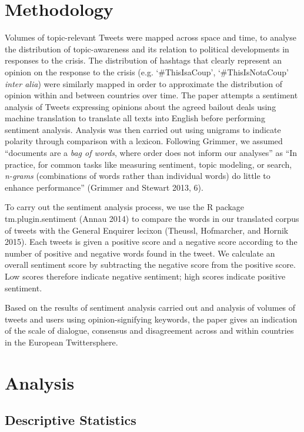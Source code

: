 \documentclass[]{article}
\begin{document}
\section{Methodology}\label{methodology}

Volumes of topic-relevant Tweets were mapped across space and time, to
analyse the distribution of topic-awareness and its relation to
political developments in responses to the crisis. The distribution of
hashtags that clearly represent an opinion on the response to the crisis
(e.g. `\#ThisIsaCoup', `\#ThisIsNotaCoup' \emph{inter alia}) were
similarly mapped in order to approximate the distribution of opinion
within and between countries over time. The paper attempts a sentiment
analysis of Tweets expressing opinions about the agreed bailout deals
using machine translation to translate all texts into English before
performing sentiment analysis. Analysis was then carried out using
unigrams to indicate polarity through comparison with a lexicon.
Following Grimmer, we assumed ``documents are a \emph{bag of words},
where order does not inform our analyses'' as ``In practice, for common
tasks like measuring sentiment, topic modeling, or search,
\emph{n-grams} (combinations of words rather than individual words) do
little to enhance performance'' (Grimmer and Stewart 2013, 6).

To carry out the sentiment analysis process, we use the R package
tm.plugin.sentiment (Annau 2014) to compare the words in our translated
corpus of tweets with the General Enquirer lecixon (Theussl, Hofmarcher,
and Hornik 2015). Each tweets is given a positive score and a negative
score according to the number of positive and negative words found in
the tweet. We calculate an overall sentiment score by subtracting the
negative score from the positive score. Low scores therefore indicate
negative sentiment; high scores indicate positive sentiment.

Based on the results of sentiment analysis carried out and analysis of
volumes of tweets and users using opinion-signifying keywords, the paper
gives an indication of the scale of dialogue, consensus and disagreement
across and within countries in the European Twittersphere.

\section{Analysis}\label{analysis}

\subsection{Descriptive Statistics}\label{descriptive-statistics}
\end{document}
